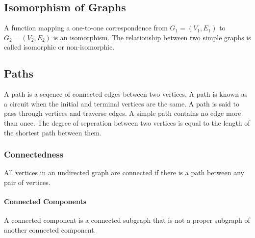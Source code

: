 \documentclass[a4paper, 10pt]{article}
\begin{document}
\subsection{Isomorphism of Graphs}
A function mapping a one-to-one correspondence from \(G_1=(V_1, E_1)\) to \(G_2=(V_2, E_2)\) is an isomorphism. The relationship between two simple graphs is called isomorphic or non-isomorphic.
\subsection{Paths}
A path is a seqence of connected edges between two vertices. A path is known as a circuit when the initial and terminal vertices are the same. A path is said to pass through vertices and traverse edges. A simple path contains no edge more than once. The degree of seperation between two vertices is equal to the length of the shortest path between them.
\subsubsection{Connectedness}
All vertices in an undirected graph are connected if there is a path between any pair of vertices.
\paragraph{Connected Components}
A connected component is a connected subgraph that is not a proper subgraph of another connected component.
\begin{center}
\end{center}
\end{document}
